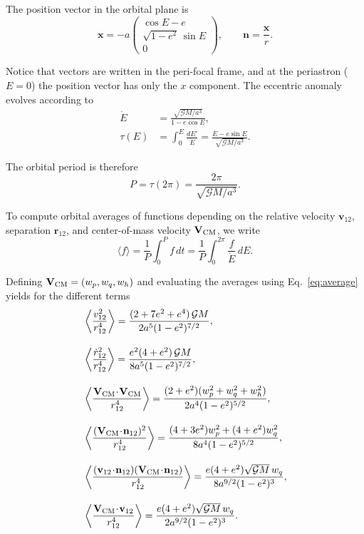 \documentclass[
    floats,
    floatfix,
    amssymb,
    prd,
    twocolumn,
    superscriptaddress,
    nofootinbib,
    unicode,
    colorlinks=true,
    linktocpage=true
]{revtex4-2}
\begin{document}
The position vector in the orbital plane is
%
\begin{equation}
\mathbf{x} =
-a
\begin{pmatrix}
\cos E - e \\
\sqrt{1-e^2}\,\sin E \\
0
\end{pmatrix},
\qquad
\mathbf{n} = \frac{\mathbf{x}}{r}.
\end{equation}

Notice that vectors are written in the peri-focal frame, and at the
periastron ($E=0$) the position vector has only the $x$ component.
The eccentric anomaly evolves according to
%
\begin{align}
\dot E &= 
\frac{\sqrt{\mathcal{G} M / a^3}}
     {1 - e \cos E}, \\
\tau(E) &=
\int_0^E \frac{dE'}{\dot E}
= \frac{E - e \sin E}
       {\sqrt{\mathcal{G} M / a^3}} .
\end{align}

The orbital period is therefore
%
\begin{equation}
P = \tau(2\pi)
  = \frac{2\pi}{\sqrt{\mathcal{G} M / a^3}} .
\end{equation}

To compute orbital averages of functions depending on the relative
velocity $\mathbf{v}_{12}$, separation $\mathbf{r}_{12}$, and
center-of-mass velocity $\mathbf{V}_{\rm CM}$, we write
%
\begin{equation}
\label{eq:average}
\langle f \rangle =
\frac{1}{P}\int_0^P f\,dt
=
\frac{1}{P}\int_0^{2\pi}
\frac{f}{\dot E}\,dE .
\end{equation}

Defining $\mathbf{V}_{\rm CM} = (w_p,w_q,w_h)$ and evaluating the
averages using Eq.~\eqref{eq:average} yields for the different terms
\begin{align}
&\left\langle\frac{v_{12}^2}{r_{12}^4}\right\rangle
=
\frac{(2+7e^2+e^4)\,\mathcal{G}M}
     {2a^5(1-e^2)^{7/2}}, \\[10pt]
%
&\left\langle\frac{\dot r_{12}^2}{r_{12}^4}\right\rangle
=
\frac{e^2(4+e^2)\,\mathcal{G}M}
     {8a^5(1-e^2)^{7/2}}, \\[10pt]
%
&\left\langle\frac{\mathbf{V}_{\rm CM}\!\cdot\!
      \mathbf{V}_{\rm CM}}{r_{12}^4}\right\rangle
=
\frac{(2+e^2)(w_p^2+w_q^2+w_h^2)}
     {2a^4(1-e^2)^{5/2}}, \\[10pt]
%
&\left\langle\frac{(\mathbf{V}_{\rm CM}\!\cdot\!
       \mathbf{n}_{12})^2}{r_{12}^4}\right\rangle
=
\frac{(4+3e^2)w_p^2 + (4+e^2)w_q^2}
     {8a^{4}(1-e^2)^{5/2}}, \\[10pt]
%
&\left\langle\frac{(\mathbf{v}_{12}\!\cdot\!\mathbf{n}_{12})
      (\mathbf{V}_{\rm CM}\!\cdot\!\mathbf{n}_{12})}
     {r_{12}^4}\right\rangle
=
\frac{e(4+e^2)\sqrt{\mathcal{G}M}\,w_q}
     {8a^{9/2}(1-e^2)^3}, \\[10pt]
%
&\left\langle\frac{\mathbf{V}_{\rm CM}\!\cdot\!\mathbf{v}_{12}}
     {r_{12}^4}\right\rangle
=
\frac{e(4+e^2)\sqrt{\mathcal{G}M}\,w_q}
     {2a^{9/2}(1-e^2)^3}.
\end{align}
\end{document}
